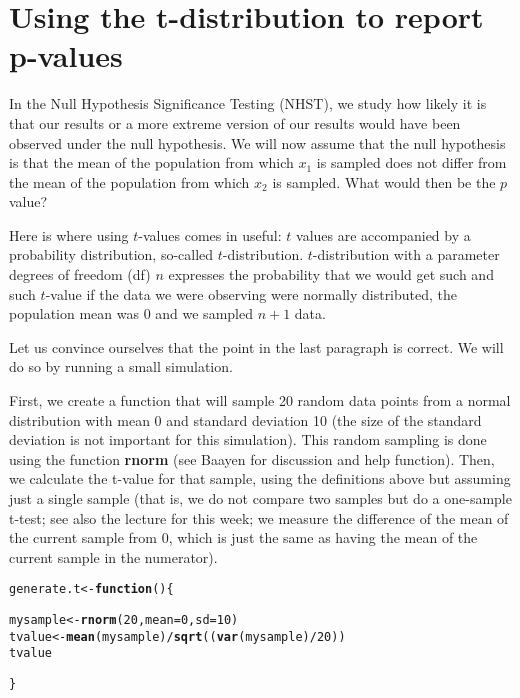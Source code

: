 \documentclass{article}\usepackage[]{graphicx}\usepackage[]{color}
\makeatletter
\newcommand{\hlnum}[1]{\textcolor[rgb]{0.686,0.059,0.569}{#1}}%
\newcommand{\hlopt}[1]{\textcolor[rgb]{0,0,0}{#1}}%
\newcommand{\hlstd}[1]{\textcolor[rgb]{0.345,0.345,0.345}{#1}}%
\newcommand{\hlkwa}[1]{\textcolor[rgb]{0.161,0.373,0.58}{\textbf{#1}}}%
\newcommand{\hlkwb}[1]{\textcolor[rgb]{0.69,0.353,0.396}{#1}}%
\newcommand{\hlkwc}[1]{\textcolor[rgb]{0.333,0.667,0.333}{#1}}%
\newcommand{\hlkwd}[1]{\textcolor[rgb]{0.737,0.353,0.396}{\textbf{#1}}}%
\newenvironment{kframe}{%
 \def\at@end@of@kframe{}%
 \ifinner\ifhmode%
  \def\at@end@of@kframe{\end{minipage}}%
  \begin{minipage}{\columnwidth}%
 \fi\fi%
 \def\FrameCommand##1{\hskip\@totalleftmargin \hskip-\fboxsep
 \colorbox{shadecolor}{##1}\hskip-\fboxsep
     \hskip-\linewidth \hskip-\@totalleftmargin \hskip\columnwidth}%
 \MakeFramed {\advance\hsize-\width
   \@totalleftmargin\z@ \linewidth\hsize
   \@setminipage}}%
 {\par\unskip\endMakeFramed%
 \at@end@of@kframe}
\newenvironment{knitrout}{}{} %
\makeatother
\begin{document}
\section{Using the t-distribution to report p-values}

In the Null Hypothesis Significance Testing (NHST), we study how likely it is that our results or a more extreme version of our results would have been observed under the null hypothesis. We will now assume that the null hypothesis is that the mean of the population from which $x_1$ is sampled does not differ from the mean of the population from which $x_2$ is sampled. What would then be the $p$ value?

Here is where using $t$-values comes in useful: $t$ values are accompanied by a probability distribution, so-called $t$-distribution. $t$-distribution with a parameter degrees of freedom (df) $n$ expresses the probability that we would get such and such $t$-value if the data we were observing were normally distributed, the population mean was 0 and we sampled $n+1$ data.

Let us convince ourselves that the point in the last paragraph is correct. We will do so by running a small simulation.

First, we create a function that will sample 20 random data points from a normal distribution with mean 0 and standard deviation 10 (the size of the standard deviation is not important for this simulation). This random sampling is done using the function \textbf{rnorm} (see Baayen for discussion and help function). Then, we calculate the t-value for that sample, using the definitions above but assuming just a single sample (that is, we do not compare two samples but do a one-sample t-test; see also the lecture for this week; we measure the difference of the mean of the current sample from 0, which is just the same as having the mean of the current sample in the numerator).

\begin{knitrout}
\color{fgcolor}\begin{kframe}
\begin{alltt}
\hlstd{generate.t} \hlkwb{<-} \hlkwa{function}\hlstd{() \{}

    \hlstd{mysample} \hlkwb{<-} \hlkwd{rnorm}\hlstd{(}\hlnum{20}\hlstd{,} \hlkwc{mean} \hlstd{=} \hlnum{0}\hlstd{,} \hlkwc{sd} \hlstd{=} \hlnum{10}\hlstd{)}
    \hlstd{tvalue} \hlkwb{<-} \hlkwd{mean}\hlstd{(mysample)}\hlopt{/}\hlkwd{sqrt}\hlstd{((}\hlkwd{var}\hlstd{(mysample)}\hlopt{/}\hlnum{20}\hlstd{))}
    \hlstd{tvalue}

\hlstd{\}}
\end{alltt}
\end{kframe}
\end{knitrout}
\end{document}
